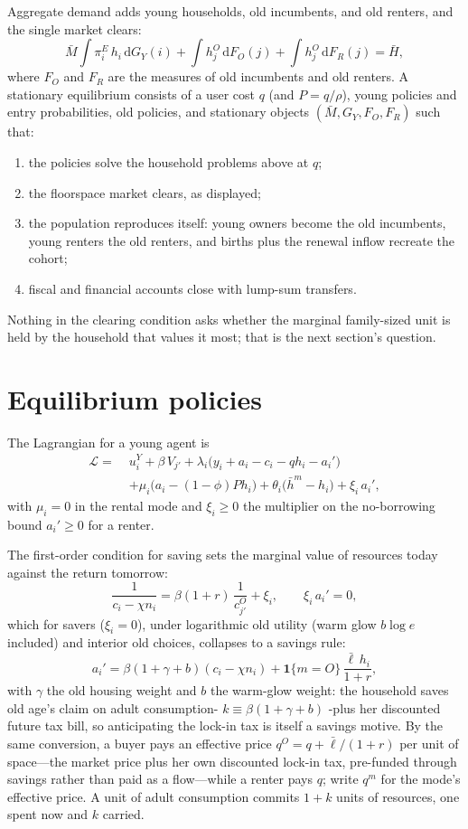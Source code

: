 \documentclass[11pt]{article}
\newcommand{\dd}{\mathrm d}
\begin{document}
Aggregate demand adds young households, old incumbents, and old renters, and the single market clears:
\[
\bar M\int\pi_i^E\,h_i\,\dd G_Y(i)+\int h_j^O\,\dd F_O(j)+\int h_j^O\,\dd F_R(j)=\bar H ,
\]
where $F_O$ and $F_R$ are the measures of old incumbents and old renters.
A stationary equilibrium consists of a user cost $q$ (and $P=q/\rho$), young policies and entry probabilities, old policies, and stationary objects $(\bar M,G_Y,F_O,F_R)$ such that:
\begin{enumerate}
\item the policies solve the household problems above at $q$;
\item the floorspace market clears, as displayed;
\item the population reproduces itself: young owners become the old incumbents, young renters the old renters, and births plus the renewal inflow recreate the cohort;
\item fiscal and financial accounts close with lump-sum transfers.
\end{enumerate}
Nothing in the clearing condition asks whether the marginal family-sized unit is held by the household that values it most; that is the next section's question.

\section{Equilibrium policies}

The Lagrangian for a young agent is
\[
\begin{aligned}
\mathcal L=\;&u_i^Y+\beta\,V_{j'}+\lambda_i\big(y_i+a_i-c_i-qh_i-a_i'\big)\\
&+\mu_i\big(a_i-(1-\phi)Ph_i\big)+\theta_i\big(\bar h^m-h_i\big)+\xi_i\,a_i',
\end{aligned}
\]
with $\mu_i=0$ in the rental mode and $\xi_i\ge0$ the multiplier on the no-borrowing bound $a_i'\ge0$ for a renter. 

The first-order condition for saving sets the marginal value of resources today against the return tomorrow:
\[
\frac{1}{c_i-\chi n_i}=\beta(1+r)\,\frac{1}{c_{j'}^O}+\xi_i,
\qquad
\xi_i\,a_i'=0,
\]
which for savers ($\xi_i=0$), under logarithmic old utility (warm glow $b\log e$ included) and interior old choices, collapses to a savings rule:
\[
a_i'=\beta\left(1+\gamma+b\right)(c_i-\chi n_i)+\mathbf 1\{m=O\}\,\frac{\bar\ell\,h_i}{1+r},
\]
with $\gamma$ the old housing weight and $b$ the warm-glow weight: the household saves old age's claim on adult consumption- $k\equiv\beta(1+\gamma+b)$ -plus her discounted future tax bill, so anticipating the lock-in tax is itself a savings motive. By the same conversion, a buyer pays an effective price $q^O=q+\bar\ell/(1+r)$ per unit of space---the market price plus her own discounted lock-in tax, pre-funded through savings rather than paid as a flow---while a renter pays $q$; write $q^m$ for the mode's effective price. A unit of adult consumption commits $1+k$ units of resources, one spent now and $k$ carried.
\end{document}
